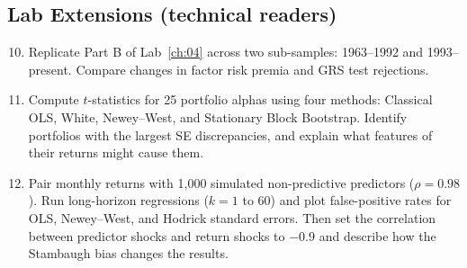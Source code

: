 \subsection*{Lab Extensions (technical readers)}
\begin{enumerate}
  \setcounter{enumi}{9}
  \item Replicate Part B of Lab~\ref{ch:04} across two sub-samples: 1963--1992 and 1993--present. Compare changes in factor risk premia and GRS test rejections.
  \item Compute $t$-statistics for 25 portfolio alphas using four methods: Classical OLS, White, Newey--West, and Stationary Block Bootstrap. Identify portfolios with the largest SE discrepancies, and explain what features of their returns might cause them.
  \item Pair monthly returns with 1,000 simulated non-predictive predictors ($\rho = 0.98$). Run long-horizon regressions ($k=1$ to $60$) and plot false-positive rates for OLS, Newey--West, and Hodrick standard errors. Then set the correlation between predictor shocks and return shocks to $-0.9$ and describe how the Stambaugh bias changes the results.
\end{enumerate}
